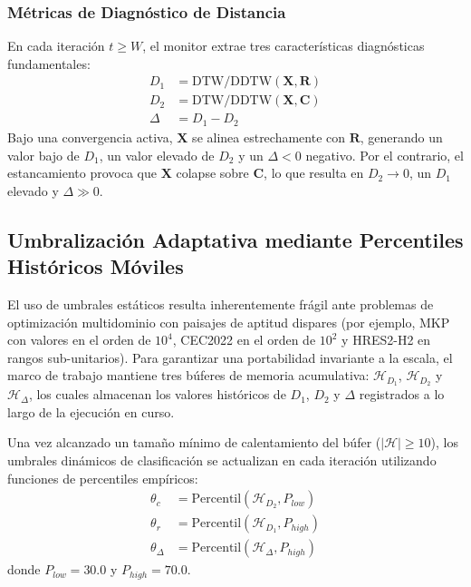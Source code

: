 \subsubsection{Métricas de Diagnóstico de Distancia}

En cada iteración $t \ge W$, el monitor extrae tres características diagnósticas fundamentales:
\begin{align}
D_1 &= \text{DTW/DDTW}(\mathbf{X}, \mathbf{R}) \label{eq:d1_dist} \\
D_2 &= \text{DTW/DDTW}(\mathbf{X}, \mathbf{C}) \label{eq:d2_dist} \\
\Delta &= D_1 - D_2 \label{eq:delta_metric}
\end{align}
Bajo una convergencia activa, $\mathbf{X}$ se alinea estrechamente con $\mathbf{R}$, generando un valor bajo de $D_1$, un valor elevado de $D_2$ y un $\Delta < 0$ negativo. Por el contrario, el estancamiento provoca que $\mathbf{X}$ colapse sobre $\mathbf{C}$, lo que resulta en $D_2 \to 0$, un $D_1$ elevado y $\Delta \gg 0$.

\subsection{Umbralización Adaptativa mediante Percentiles Históricos Móviles}
\label{sec:adaptive_thresholding}

El uso de umbrales estáticos resulta inherentemente frágil ante problemas de optimización multidominio con paisajes de aptitud dispares (por ejemplo, MKP con valores en el orden de $10^4$, CEC2022 en el orden de $10^2$ y HRES2-H2 en rangos sub-unitarios). Para garantizar una portabilidad invariante a la escala, el marco de trabajo mantiene tres búferes de memoria acumulativa: $\mathcal{H}_{D_1}$, $\mathcal{H}_{D_2}$ y $\mathcal{H}_{\Delta}$, los cuales almacenan los valores históricos de $D_1$, $D_2$ y $\Delta$ registrados a lo largo de la ejecución en curso.

Una vez alcanzado un tamaño mínimo de calentamiento del búfer ($|\mathcal{H}| \ge 10$), los umbrales dinámicos de clasificación se actualizan en cada iteración utilizando funciones de percentiles empíricos:
\begin{align}
\theta_c &= \text{Percentil}\left(\mathcal{H}_{D_2}, P_{low}\right) \label{eq:theta_c} \\
\theta_r &= \text{Percentil}\left(\mathcal{H}_{D_1}, P_{high}\right) \label{eq:theta_r} \\
\theta_\Delta &= \text{Percentil}\left(\mathcal{H}_{\Delta}, P_{high}\right) \label{eq:theta_delta}
\end{align}
donde $P_{low} = 30.0$ y $P_{high} = 70.0$.

